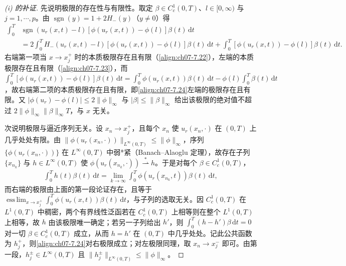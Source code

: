 \documentclass[../../main.tex]{subfiles}%
\begin{document}
\begin{proof}[(i) 的补证]
先说明极限的存在性与有限性。取定 $\beta\in C^1_c(0,T)$、$l\in[0,\infty)$ 与 $j=1,\cdots,p$。由 $\operatorname{sgn}(y)=1+2H_-(y)$（$y\ne0$）得
\begin{align*}
\int_0^T&\operatorname{sgn}(u_r(x,t)-l)[\phi(u_r(x,t))-\phi(l)]\beta(t)\,\mathrm{d}t\\
&=2\int_0^T H_-(u_r(x,t)-l)[\phi(u_r(x,t))-\phi(l)]\beta(t)\,\mathrm{d}t+\int_0^T[\phi(u_r(x,t))-\phi(l)]\beta(t)\,\mathrm{d}t.
\end{align*}
右端第一项当 $x\to x_j^+$ 时的本质极限存在且有限（\eqref{align:ch07-7.22}），左端的本质极限存在且有限（\eqref{align:ch07-7.23}），而 $\int_0^T[\phi(u_r(x,t))-\phi(l)]\beta(t)\,\mathrm{d}t=\int_0^T\phi(u_r(x,t))\beta(t)\,\mathrm{d}t-\phi(l)\int_0^T\beta(t)\,\mathrm{d}t$，故右端第二项的本质极限存在且有限，即\eqref{align:ch07-7.24}左端的极限存在且有限。又 $|\phi(u_r)-\phi(l)|\leqslant2\|\phi\|_\infty$ 与 $|\beta|\leqslant\|\beta\|_\infty$ 给出该极限的绝对值不超过 $2\|\phi\|_\infty\|\beta\|_\infty T$，与 $x$ 无关。

次说明极限与逼近序列无关。设 $x_n\to x_j^+$，且每个 $x_n$ 使 $u_r(x_n,\cdot)$ 在 $(0,T)$ 上几乎处处有限。由 $\|\phi(u_r(x_n,\cdot))\|_{L^\infty(0,T)}\leqslant\|\phi\|_\infty$，序列 $\{\phi(u_r(x_n,\cdot))\}$ 在 $L^\infty(0,T)$ 中弱*紧（Banach--Alaoglu 定理），故存在子列 $\{x_{n_k}\}$ 与 $h\in L^\infty(0,T)$ 使 $\phi(u_r(x_{n_k},\cdot))\stackrel{*}{\rightharpoonup}h$。于是对每个 $\beta\in C^1_c(0,T)$，
\begin{align*}
\int_0^Th(t)\beta(t)\,\mathrm{d}t=\lim_{k\to\infty}\int_0^T\phi(u_r(x_{n_k},t))\beta(t)\,\mathrm{d}t,
\end{align*}
而右端的极限由上面的第一段论证存在，且等于 $\operatorname*{ess\,lim}_{x\to x_j^+}\int_0^T\phi(u_r(x,t))\beta(t)\,\mathrm{d}t$，与子列的选取无关。因 $C^1_c(0,T)$ 在 $L^1(0,T)$ 中稠密，两个有界线性泛函若在 $C^1_c(0,T)$ 上相等则在整个 $L^1(0,T)$ 上相等，故 $h$ 由该极限唯一确定；若另一子列给出 $h'$，则 $\int_0^T(h-h')\beta\,\mathrm{d}t=0$ 对一切 $\beta\in C^1_c(0,T)$ 成立，从而 $h=h'$ 在 $(0,T)$ 中几乎处处。记此公共函数为 $h_j^+$，则\eqref{align:ch07-7.24}对右极限成立；对左极限同理，取 $x_n\to x_j^-$ 即可。由第一段，$h_j^\pm\in L^\infty(0,T)$ 且 $\|h_j^\pm\|_{L^\infty(0,T)}\leqslant\|\phi\|_\infty$。
\end{proof}
\end{document}
